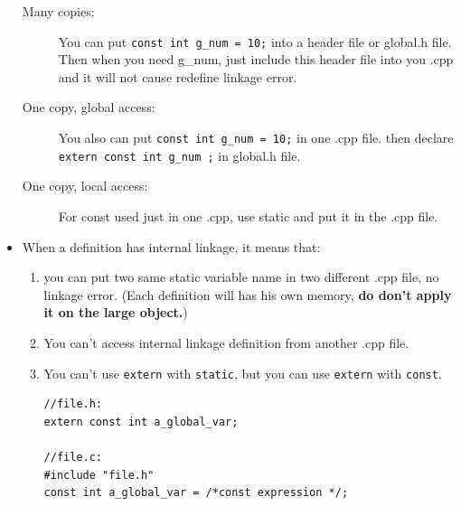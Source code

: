 \documentclass[a4paper,11pt,twoside]{book}
\begin{document}
\begin{itemize}
	\begin{description}
		\item[Many copies:] You can put \texttt{const int g\_num = 10;} into a header file or global.h file. Then when you need g\_num, just include this header file into you .cpp and it will not cause redefine linkage error. 
		
		\item[One copy, global access:] You also can put \texttt{const int g\_num = 10;} in one .cpp file. then declare \texttt{extern const int g\_num ;} in global.h file. 
		
		\item[One copy, local access:] For const used just in one .cpp, use static and put it in the .cpp file.
	\end{description}
	
	\item When a definition has internal linkage, it means that:
	\begin{enumerate}
		\item you can put two same static variable name in two different .cpp file, no linkage error. (Each definition will has his own memory, \textbf{do don't apply it on the large object.})
		\item You can't access internal linkage definition from another .cpp file. 
		\item You can't use \texttt{extern} with \texttt{static}, but you can use \texttt{extern} with \texttt{const}.
\begin{lstlisting}[numbers=none]
//file.h:
extern const int a_global_var;

//file.c:
#include "file.h"
const int a_global_var = /*const expression */;
\end{lstlisting}
\end{enumerate}


\end{itemize}
\end{document}
